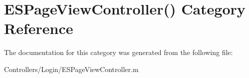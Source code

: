 \hypertarget{category_e_s_page_view_controller_07_08}{}\section{E\+S\+Page\+View\+Controller() Category Reference}
\label{category_e_s_page_view_controller_07_08}


The documentation for this category was generated from the following file\+:\begin{DoxyCompactItemize}
\item 
Controllers/\+Login/E\+S\+Page\+View\+Controller.\+m\end{DoxyCompactItemize}

